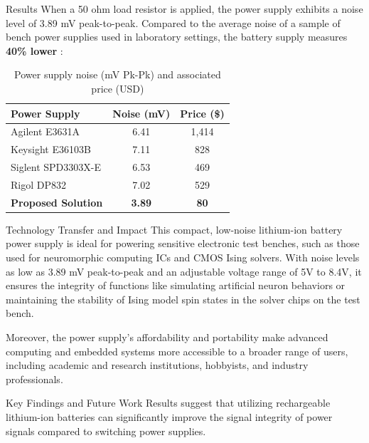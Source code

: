 \documentclass[final]{beamer}
\newlength{\colwidth}
\begin{document}
\begin{frame}[t]
\begin{columns}[t]
\begin{column}{\colwidth}
\begin{block}{Results}
					When a 50 ohm load resistor is applied, the power supply exhibits a noise
					level of 3.89 mV peak-to-peak. Compared to the average noise of a sample of bench power
					supplies used in laboratory settings, the battery supply measures \textbf{
					40\% lower }:

					\begin{table}
						\centering
						\begin{tabular}{lcc}
							\toprule Power Supply      & Noise (mV)    & Price (\$)  \\
							\midrule Agilent E3631A    & 6.41          & 1,414       \\
							Keysight E36103B           & 7.11          & 828         \\
							Siglent SPD3303X-E         & 6.53          & 469         \\
							Rigol DP832                & 7.02          & 529         \\
							\textbf{Proposed Solution} & \textbf{3.89} & \textbf{80} \\
							\bottomrule
						\end{tabular}
						\caption{Power supply noise (mV Pk-Pk) and associated price (USD)}
					\end{table}
				\end{block}

				\begin{block}{Technology Transfer and Impact}
					This compact, low-noise lithium-ion battery power supply is ideal for
					powering sensitive electronic test benches, such as those used for neuromorphic
					computing ICs and CMOS Ising solvers. With noise levels as low as 3.89
					mV peak-to-peak and an adjustable voltage range of 5V to 8.4V, it
					ensures the integrity of functions like simulating artificial neuron
					behaviors or maintaining the stability of Ising model spin states in
					the solver chips on the test bench.

					Moreover, the power supply's affordability and portability make advanced
					computing and embedded systems more accessible to a broader range of users,
					including academic and research institutions, hobbyists, and industry
					professionals.
				\end{block}

				\begin{block}{Key Findings and Future Work}
					Results suggest that utilizing rechargeable lithium-ion batteries can significantly
					improve the signal integrity of power signals compared to switching power
					supplies.


\end{block}
\end{column}
\end{columns}
\end{frame}
\end{document}
